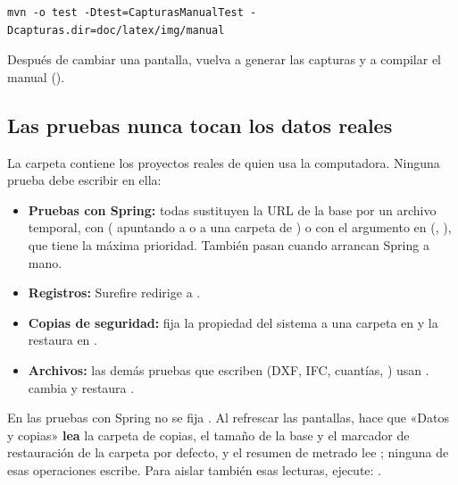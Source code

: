 \begin{verbatim}
mvn -o test -Dtest=CapturasManualTest -Dcapturas.dir=doc/latex/img/manual
\end{verbatim}

Después de cambiar una pantalla, vuelva a generar las capturas y a compilar el manual ().

\subsection{Las pruebas nunca tocan los datos reales}

La carpeta  contiene los proyectos reales de quien usa la computadora.
Ninguna prueba debe escribir en ella:

\begin{itemize}
	\item \textbf{Pruebas con Spring:} todas sustituyen la URL de la base por un archivo temporal, con
	       ( apuntando a  o a una
	      carpeta de ) o con el argumento  en
	       (, ), que tiene la máxima
	      prioridad. También pasan  cuando arrancan Spring a mano.
	\item \textbf{Registros:} Surefire redirige  a .
	\item \textbf{Copias de seguridad:}  fija la propiedad del sistema  a una
	      carpeta  en  y la restaura en .
	\item \textbf{Archivos:} las demás pruebas que escriben (DXF, IFC, cuantías, ) usan
	      .  cambia y restaura .
\end{itemize}

\begin{importante}
En las pruebas con Spring no se fija . Al refrescar las pantallas,  hace
que «Datos y copias» \textbf{lea} la carpeta de copias, el tamaño de la base y el marcador de restauración de la
carpeta por defecto, y el resumen de metrado lee ; ninguna de esas operaciones escribe.
Para aislar también esas lecturas, ejecute:
.
\end{importante}

